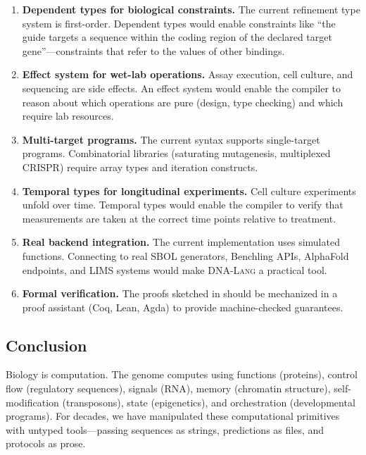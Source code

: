 \documentclass[12pt,a4paper]{article}
\newcommand{\DNALang}{\textsc{DNA-Lang}}
\begin{document}
\begin{enumerate}
    \item \textbf{Dependent types for biological constraints.} The current refinement type system is first-order. Dependent types would enable constraints like ``the guide targets a sequence within the coding region of the declared target gene''---constraints that refer to the values of other bindings.

    \item \textbf{Effect system for wet-lab operations.} Assay execution, cell culture, and sequencing are side effects. An effect system would enable the compiler to reason about which operations are pure (design, type checking) and which require lab resources.

    \item \textbf{Multi-target programs.} The current syntax supports single-target programs. Combinatorial libraries (saturating mutagenesis, multiplexed CRISPR) require array types and iteration constructs.

    \item \textbf{Temporal types for longitudinal experiments.} Cell culture experiments unfold over time. Temporal types would enable the compiler to verify that measurements are taken at the correct time points relative to treatment.

    \item \textbf{Real backend integration.} The current implementation uses simulated functions. Connecting to real SBOL generators, Benchling APIs, AlphaFold endpoints, and LIMS systems would make \DNALang{} a practical tool.

    \item \textbf{Formal verification.} The proofs sketched in  should be mechanized in a proof assistant (Coq, Lean, Agda) to provide machine-checked guarantees.
\end{enumerate}

\subsection{Conclusion}

Biology is computation. The genome computes using functions (proteins), control flow (regulatory sequences), signals (RNA), memory (chromatin structure), self-modification (transposons), state (epigenetics), and orchestration (developmental programs). For decades, we have manipulated these computational primitives with untyped tools---passing sequences as strings, predictions as files, and protocols as prose.
\end{document}
